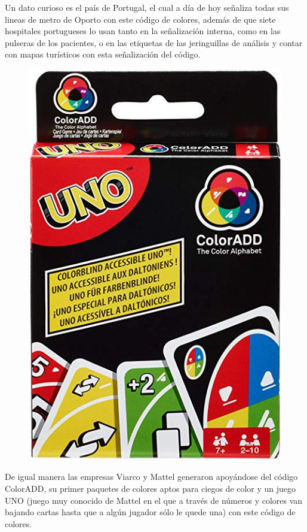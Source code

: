 \documentclass[10pt]{article}
\begin{document}
Un dato curioso es el país de Portugal, el cual a día de hoy señaliza todas sus lineas de metro de Oporto con este código de colores, además de que siete hospitales portugueses lo usan tanto en la señalización interna, como en las pulseras de los pacientes, o en las etiquetas de las jeringuillas de análisis y contar con mapas turísticos con esta señalización del código.


\begin{figure}[H]
	\begin{center}
\includegraphics[scale = 0.25]{Imagenes/UNO.jpg}
	\end{center} 
\end{figure}

De igual manera las empresas Viarco y Mattel generaron apoyándose del código ColorADD, su primer paquetes de colores aptos para ciegos de color y un juego UNO (juego muy conocido de Mattel en el que a través de números y colores van bajando cartas hasta que a algún jugador sólo le quede una) con este código de colores.   
\end{document}
